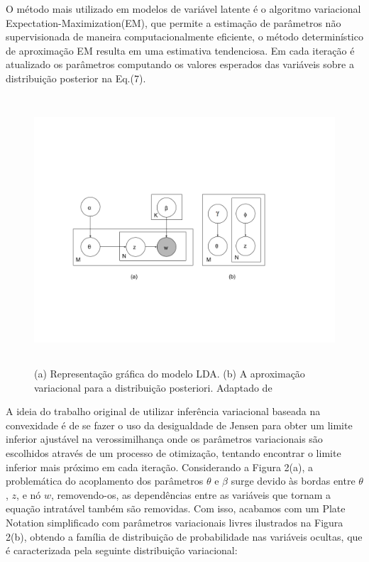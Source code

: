 \documentclass[12pt,a4paper]{article}
\begin{document}
  O método mais utilizado em modelos de variável latente é o algoritmo variacional Expectation-Maximization(EM), que permite a estimação de parâmetros não supervisionada de maneira computacionalmente eficiente, o método determinístico de aproximação EM resulta em uma estimativa tendenciosa. Em cada iteração é atualizado os parâmetros computando os valores esperados das variáveis sobre a distribuição posterior na Eq.(7).
  
  
  \begin{figure}[h]
    \centering
      \includegraphics[height=10cm]{images/figure_2.png}
      \caption{(a) Representação gráfica do modelo LDA. (b) A aproximação variacional para a distribuição posteriori. Adaptado de }
  \end{figure}
  
  A ideia do trabalho original de utilizar inferência variacional baseada na convexidade é de se fazer o uso da desigualdade de Jensen para obter um limite inferior ajustável na verossimilhança \cite{jordan1999introduction} onde os parâmetros variacionais são escolhidos através de um processo de otimização, tentando encontrar o limite inferior mais próximo em cada iteração. Considerando a Figura 2(a), a problemática do acoplamento dos parâmetros $\theta$ e $\beta$ surge devido às bordas entre $\theta$, $z$, e nó $w$, removendo-os, as dependências entre as variáveis que tornam a equação intratável também são removidas. Com isso, acabamos com um Plate Notation simplificado com parâmetros variacionais livres ilustrados na Figura 2(b), obtendo a família de distribuição de probabilidade nas variáveis ocultas, que é caracterizada pela seguinte distribuição variacional:
  
\end{document}

